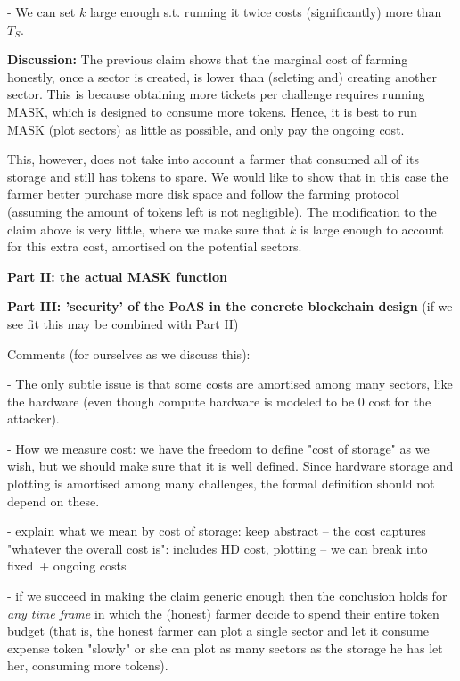 \documentclass[12pt,draftcls,onecolumn]{IEEEtran}
\begin{document}
- We can set $k$ large enough s.t. running it twice costs (significantly) more than $T_S$.

\textbf{Discussion:} The previous claim shows that the marginal cost of farming honestly, once a sector is created, is lower than (seleting and) creating another sector. This is because obtaining more tickets per challenge requires running MASK, which is designed to consume more tokens. Hence, it is best to run MASK (plot sectors) as little as possible, and only pay the ongoing cost. 

This, however, does not take into account a farmer that consumed all of its storage and still has tokens to spare. We would like to show that in this case the farmer better purchase more disk space and follow the farming protocol (assuming the amount of tokens left is not negligible). The modification to the claim above is very little, where we make sure that $k$ is large enough to account for this extra cost, amortised on the potential sectors.




\textbf{Part II: the actual MASK function}



\textbf{Part III: 'security' of the PoAS in the concrete blockchain design}
(if we see fit this may be combined with Part II)


Comments (for ourselves as we discuss this):

- The only subtle issue is that some costs are amortised among many sectors, like the hardware (even though compute hardware is modeled to be 0 cost for the attacker).

- How we measure cost: we have the freedom to define "cost of storage" as we wish, but we should make sure that it is well defined. Since hardware storage and plotting is amortised among many challenges, the formal definition should not depend on these.

- explain what we mean by cost of storage: keep abstract -- the cost captures "whatever the overall cost is": includes HD cost, plotting -- we can break into fixed + ongoing costs

- if we succeed in making the claim generic enough then the conclusion holds for \textit{any time frame} in which the (honest) farmer decide to spend their entire token budget (that is, the honest farmer can plot a single sector and let it consume expense token "slowly" or she can plot as many sectors as the storage he has let her, consuming more tokens).
\end{document}
